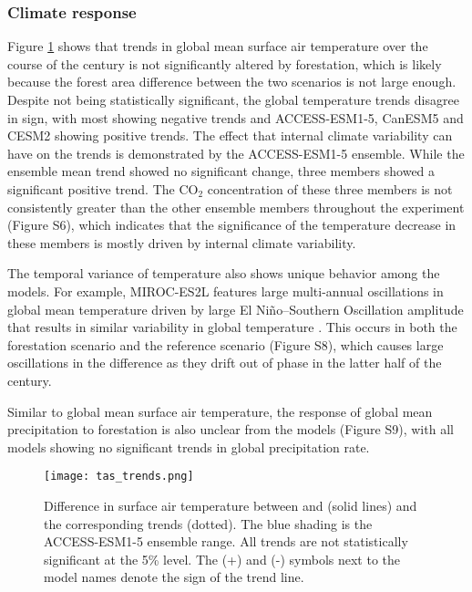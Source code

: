\documentclass[draft]{agujournal2019}
\begin{document}
\subsubsection{Climate response}

Figure \ref{fig:models_tas_trends} shows that trends in global mean surface air temperature over the course of the century is not significantly altered by forestation, which is likely because the forest area difference between the two scenarios is not large enough.
Despite not being statistically significant, the global temperature trends disagree in sign, with most showing negative trends and ACCESS-ESM1-5, CanESM5 and CESM2 showing positive trends.
The effect that internal climate variability can have on the trends is demonstrated by the ACCESS-ESM1-5 ensemble.
While the ensemble mean trend showed no significant change, three members showed a significant positive trend.
The CO$_2$ concentration of these three members is not consistently greater than the other ensemble members throughout the experiment (Figure S6), which indicates that the significance of the temperature decrease in these members is mostly driven by internal climate variability.

The temporal variance of temperature also shows unique behavior among the models.
For example, MIROC-ES2L features large multi-annual oscillations in global mean temperature driven by large El Niño–Southern Oscillation amplitude that results in similar variability in global temperature \cite{hajima_development_2020}.
This occurs in both the forestation scenario and the reference scenario (Figure S8), which causes large oscillations in the difference as they drift out of phase in the latter half of the century.

Similar to global mean surface air temperature, the response of global mean precipitation to forestation is also unclear from the models (Figure S9), with all models showing no significant trends in global precipitation rate.

\begin{figure}
    \texttt{[image: tas\_trends.png]}
    \caption{Difference in surface air temperature between  and  (solid lines) and the corresponding trends (dotted). The blue shading is the ACCESS-ESM1-5 ensemble range. All trends are not statistically significant at the 5\% level. The (+) and (-) symbols next to the model names denote the sign of the trend line.}
    \label{fig:models_tas_trends}
\end{figure}
\end{document}
